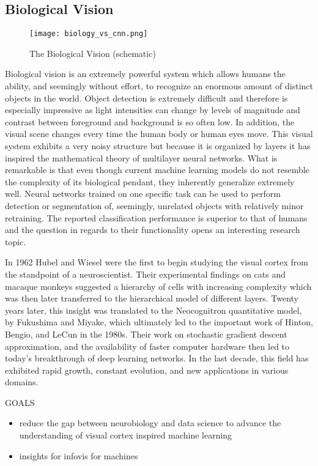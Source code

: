\subsection{Biological Vision}

\begin{figure}[t]
	  \texttt{[image: biology\_vs\_cnn.png]}
  \caption{The Biological Vision (schematic)}
	\label{fig:vision}
\end{figure}

Biological vision is an extremely powerful system which allows humans the ability, and seemingly without effort, to recognize an enormous amount of distinct objects in the world. 
Object detection is extremely difficult and therefore is especially impressive as light intensities can change by levels of magnitude and contrast between foreground and background is so often low. 
In addition, the visual scene changes every time the human body or human eyes move. 
This visual system exhibits a very noisy structure but because it is organized by layers it has inspired the mathematical theory of multilayer neural networks. 
What is remarkable is that even though current machine learning models do not resemble the complexity of its biological pendant, they inherently generalize extremely well. 
Neural networks trained on one specific task can be used to perform detection or segmentation of, seemingly, unrelated objects with relatively minor retraining. 
The reported classification performance is superior to that of humans and the question in regards to their functionality opens an interesting research topic.

In 1962 Hubel and Wiesel were the first to begin studying the visual cortex from the standpoint of a neuroscientist. Their experimental findings on cats and macaque monkeys suggested a hierarchy of cells with increasing complexity which was then later transferred to the hierarchical model of different layers. Twenty years later, this insight was translated to the Neocognitron quantitative model, by Fukushima and Miyake, which ultimately led to the important work of Hinton, Bengio, and LeCun in the 1980s. Their work on stochastic gradient descent approximation, and the availability of faster computer hardware then led to today’s breakthrough of deep learning networks. In the last decade, this field has exhibited rapid growth, constant evolution, and new applications in various domains.




GOALS
\begin{itemize}
	\item reduce the gap between neurobiology and data science to advance the understanding of visual cortex inspired machine learning
	\item insights for infovis for machines
\end{itemize}


